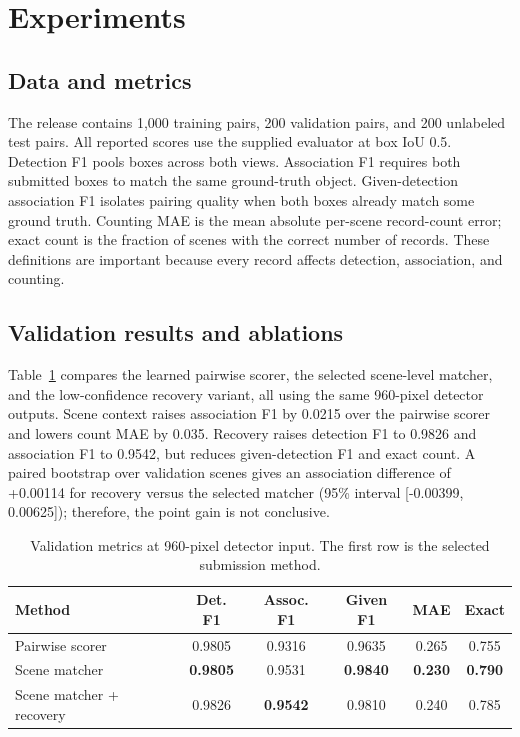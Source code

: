 \section{Experiments}
\subsection{Data and metrics}
The release contains 1,000 training pairs, 200 validation pairs, and 200 unlabeled test pairs. All reported scores use the supplied evaluator at box IoU 0.5. Detection F1 pools boxes across both views. Association F1 requires both submitted boxes to match the same ground-truth object. Given-detection association F1 isolates pairing quality when both boxes already match some ground truth. Counting MAE is the mean absolute per-scene record-count error; exact count is the fraction of scenes with the correct number of records. These definitions are important because every record affects detection, association, and counting.

\subsection{Validation results and ablations}
Table~\ref{tab:ablation} compares the learned pairwise scorer, the selected scene-level matcher, and the low-confidence recovery variant, all using the same 960-pixel detector outputs. Scene context raises association F1 by 0.0215 over the pairwise scorer and lowers count MAE by 0.035. Recovery raises detection F1 to 0.9826 and association F1 to 0.9542, but reduces given-detection F1 and exact count. A paired bootstrap over validation scenes gives an association difference of +0.00114 for recovery versus the selected matcher (95\% interval [-0.00399, 0.00625]); therefore, the point gain is not conclusive.

\begin{table}[t]
\centering
\caption{Validation metrics at 960-pixel detector input. The first row is the selected submission method.}
\label{tab:ablation}
\small
\setlength{\tabcolsep}{3.1pt}
\begin{tabular}{lccccc}
\hline
Method & Det. F1 & Assoc. F1 & Given F1 & MAE & Exact \\
\hline
Pairwise scorer & 0.9805 & 0.9316 & 0.9635 & 0.265 & 0.755 \\
Scene matcher & \textbf{0.9805} & 0.9531 & \textbf{0.9840} & \textbf{0.230} & \textbf{0.790} \\
Scene matcher + recovery & 0.9826 & \textbf{0.9542} & 0.9810 & 0.240 & 0.785 \\
\hline
\end{tabular}
\end{table}

